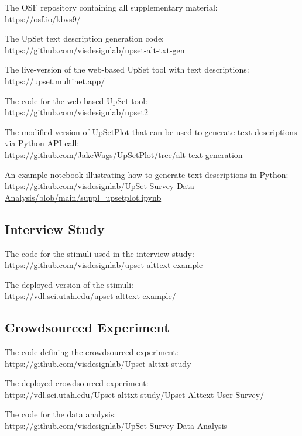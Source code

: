 \documentclass{egpubl}
\begin{document}
\noindent The OSF repository containing all supplementary material: \\
\url{https://osf.io/kbvs9/}

\noindent The UpSet text description generation code: \\
\url{https://github.com/visdesignlab/upset-alt-txt-gen}

\noindent  The live-version of the web-based UpSet tool with text descriptions: \\
\url{https://upset.multinet.app/}

\noindent The code for the web-based UpSet tool: \\
\url{https://github.com/visdesignlab/upset2}

\noindent The modified version of UpSetPlot that can be used to generate text-descriptions via Python API call: \\
\url{https://github.com/JakeWags/UpSetPlot/tree/alt-text-generation}

\noindent An example notebook illustrating how to generate text descriptions in Python:
\\
\url{https://github.com/visdesignlab/UpSet-Survey-Data-Analysis/blob/main/suppl_upsetplot.ipynb}

\subsection{Interview Study}

\noindent The code for the stimuli used in the interview study: \\
\url{https://github.com/visdesignlab/upset-alttext-example}

\noindent The deployed version of the stimuli: \\
\url{https://vdl.sci.utah.edu/upset-alttext-example/}


\noindent \subsection{Crowdsourced Experiment}
The code defining the crowdsourced experiment: \\
\url{https://github.com/visdesignlab/Upset-alttxt-study}

\noindent The deployed crowdsourced experiment: \\
\url{https://vdl.sci.utah.edu/Upset-alttxt-study/Upset-Alttext-User-Survey/}

\noindent The code for the data analysis: \\
\url{https://github.com/visdesignlab/UpSet-Survey-Data-Analysis}
\end{document}
